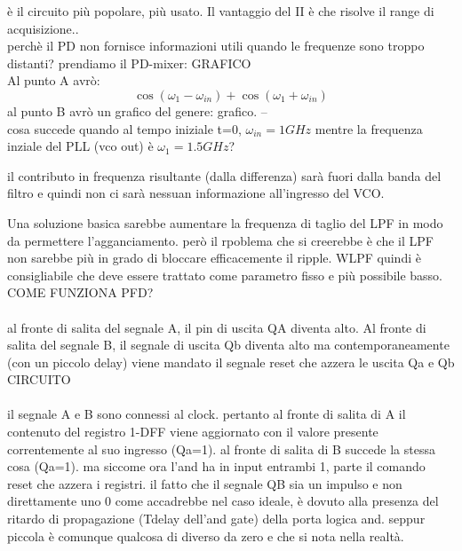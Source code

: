 è il circuito più popolare, più usato.
Il vantaggio del II è che risolve il range di acquisizione..\\
perchè il PD non fornisce informazioni utili quando le frequenze sono troppo distanti?
prendiamo il PD-mixer:
GRAFICO\\
Al punto A avrò:
\begin{equation}
    \cos(\omega_1-\omega_{in})+\cos(\omega_1+\omega_{in})
\end{equation}
al punto B avrò un grafico del genere:
grafico.
--\\
cosa succede quando al tempo iniziale t=0, $\omega_{in}=1GHz$ mentre la frequenza inziale del PLL (vco out) è $\omega_1=1.5GHz$? 

il contributo in frequenza risultante (dalla differenza) sarà fuori dalla banda del filtro e quindi non ci sarà nessuan informazione all'ingresso del VCO.

Una soluzione basica sarebbe aumentare la frequenza di taglio del LPF in modo da permettere l'agganciamento. però il rpoblema che si creerebbe è che il LPF non sarebbe più in grado di bloccare efficacemente il ripple. WLPF quindi è consigliabile che deve essere trattato come parametro fisso e più possibile basso.\\
COME FUNZIONA PFD?\\
\\%
al fronte di salita del segnale A, il pin di uscita QA diventa alto.
Al fronte di salita del segnale B, il segnale di uscita Qb diventa alto ma contemporaneamente (con un piccolo delay) viene mandato il segnale reset che azzera le uscita Qa e Qb\\
CIRCUITO\\
\\%
il segnale A e B sono connessi al clock. pertanto al fronte di salita di A il contenuto del registro 1-DFF viene aggiornato con il valore presente correntemente al suo ingresso (Qa=1).
al fronte di salita di B succede la stessa cosa (Qa=1).
ma siccome ora l'and ha in input entrambi 1, parte il comando reset che azzera i registri.
il fatto che il segnale QB sia un impulso e non direttamente uno 0 come accadrebbe nel caso ideale, è dovuto alla presenza del ritardo di propagazione (Tdelay dell'and gate) della porta logica and. seppur piccola è comunque qualcosa di diverso da zero e che si nota nella realtà.



